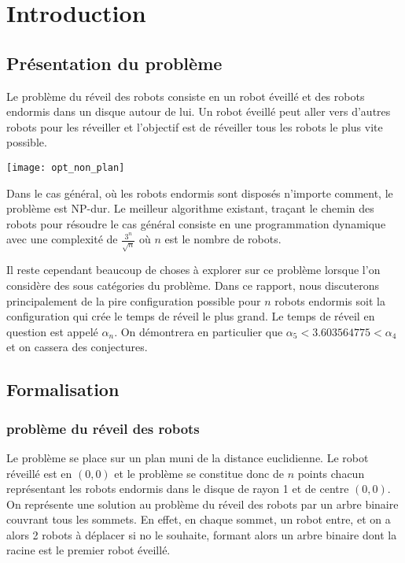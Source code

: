 \section{Introduction}

\subsection{Présentation du problème}

Le problème du réveil des robots consiste en un robot éveillé et des robots endormis dans un disque autour de lui. Un robot éveillé peut aller vers d'autres robots pour les réveiller et l'objectif est de réveiller tous les robots le plus vite possible.

\texttt{[image: opt\_non\_plan]}

Dans le cas général, où les robots endormis sont disposés n'importe comment, le problème est NP-dur. Le meilleur algorithme existant, traçant le chemin des robots pour résoudre le cas général consiste en une programmation dynamique avec une complexité de $\frac{3^n}{\sqrt{n}}$ où $n$ est le nombre de robots.

Il reste cependant beaucoup de choses à explorer sur ce problème lorsque l'on considère des sous catégories du problème. Dans ce rapport, nous discuterons principalement de la pire configuration possible pour $n$ robots endormis soit la configuration qui crée le temps de réveil le plus grand. Le temps de réveil en question est appelé $\alpha_n$. On démontrera en particulier que $\alpha_5 < 3.603564775 < \alpha_4$ et on cassera des conjectures.

\subsection{Formalisation}

\subsubsection{problème du réveil des robots}

Le problème se place sur un plan muni de la distance euclidienne. Le robot réveillé est en $(0,0)$ et le problème se constitue donc de $n$ points chacun représentant les robots endormis dans le disque de rayon 1 et de centre $(0,0)$. On représente une solution au problème du réveil des robots par un arbre binaire couvrant tous les sommets. En effet, en chaque sommet, un robot entre, et on a alors 2 robots à déplacer si no le souhaite, formant alors un arbre binaire dont la racine est le premier robot éveillé.

